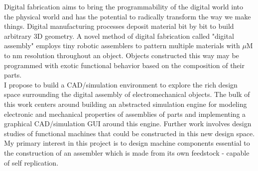 % 
% 
%
Digital fabrication aims to bring the programmability of the digital world into the physical world and has the potential to radically transform the way we make things.  Digital manufacturing processes deposit material bit by bit to build arbitrary 3D geometry.  A novel method of digital fabrication called "digital assembly" employs tiny robotic assemblers to pattern multiple materials with $\mu$M to nm resolution throughout an object.  Objects constructed this way may be programmed with exotic functional behavior based on the composition of their parts.
\\

I propose to build a CAD/simulation environment to explore the rich design space surrounding the digital assembly of electromechanical objects.  The bulk of this work centers around building an abstracted simulation engine for modeling electronic and mechanical properties of assemblies of parts and implementing a graphical CAD/simulation GUI around this engine.  Further work involves design studies of functional machines that could be constructed in this new design space.  My primary interest in this project is to design machine components essential to the construction of an assembler which is made from its own feedstock - capable of self replication. 


